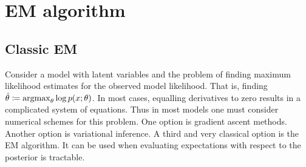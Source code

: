 \documentclass[../../main.tex]{subfiles} %
\begin{document}
	
\section{EM algorithm}
\subsection{Classic EM} \label{subsec:classic-em}
Consider a model with latent variables and the problem of finding maximum 
likelihood estimates for the observed model likelihood. That is, finding \(\hat 
\theta \coloneqq \operatorname*{argmax}_\theta \log{p(x; \theta)}\). In most cases, equalling 
derivatives to zero results in a complicated system of equations. Thus in most 
models one must consider numerical schemes for this problem. One option is 
gradient ascent methods. Another option is variational inference. A third and 
very classical option is the EM algorithm. It can be used when evaluating 
expectations with respect to the posterior is tractable.
\end{document}
